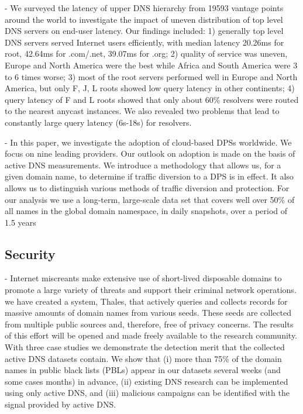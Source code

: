 \cite{liang2013measuring} - We surveyed the latency of upper DNS hierarchy from 19593 vantage points around the world to investigate the impact of uneven distribution of top level DNS servers on end-user latency. Our findings included: 1) generally top level DNS servers served Internet users efficiently, with median latency 20.26ms for root, 42.64ms for .com/.net, 39.07ms for .org; 2) quality of service was uneven, Europe and North America were the best while Africa and South America were 3 to 6 times worse; 3) most of the root servers performed well in Europe and North America, but only F, J, L roots showed low query latency in other continents; 4) query latency of F and L roots showed that only about 60\% resolvers were routed to the nearest anycast instances. We also revealed two problems that lead to constantly large query latency (6s-18s) for resolvers.

\cite{jonker2016measuring} - In this paper, we investigate the adoption of cloud-based DPSs worldwide. We focus on nine leading providers. Our outlook on adoption is made on the basis of active DNS measurements. We introduce a methodology that allows us, for a given domain name, to determine if traffic diversion to a DPS is in effect. It also allows us to distinguish various methods of traffic diversion and protection. For our analysis we use a long-term, large-scale data set that covers well over 50\% of all names in the global domain namespace, in daily snapshots, over a period of 1.5 years


\subsection{Security}
\cite{kountouras2016enabling} - Internet miscreants make extensive use of short-lived disposable domains to promote a large variety of threats and support their criminal network operations. we have created a system, Thales, that actively queries and collects records for massive amounts of domain names from various seeds. These seeds are collected from multiple public sources and, therefore, free of privacy concerns. The results of this effort will be opened and made freely available to the research community. With three case studies we demonstrate the detection merit that the collected active DNS datasets contain. We show that (i) more than 75\% of the domain names in public black lists (PBLs) appear in our datasets several weeks (and some cases months) in advance, (ii) existing DNS research can be implemented using only active DNS, and (iii) malicious campaigns can be identified with the signal provided by active DNS.


